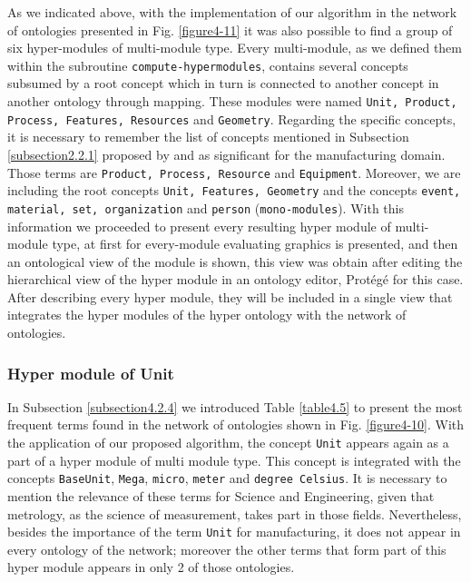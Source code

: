 As we indicated above, with the implementation of our algorithm in the network of ontologies presented in Fig. \ref{figure4-11} it was also possible to find a group of six hyper-modules of multi-module type. Every multi-module, as we defined them within the subroutine \texttt{compute-hypermodules}, contains several concepts subsumed by a root concept which in turn is connected to another concept in another ontology through mapping. These modules were named \texttt{Unit, Product, Process, Features, Resources} and \texttt{Geometry}. Regarding the specific concepts, it is necessary to remember the list of concepts mentioned in Subsection \ref{subsection2.2.1} proposed by \cite{martin_design_2003} and \cite{lastra_ontologies_2009} as significant for the manufacturing domain. Those terms are \texttt{Product, Process, Resource} and \texttt{Equipment}. Moreover, we are including the root concepts \texttt{Unit, Features, Geometry} and the concepts \texttt{event, material, set, organization} and \texttt{person} (\texttt{mono-modules}). With this information we proceeded to present every resulting hyper module of multi-module type, at first for every-module evaluating graphics is presented, and then an ontological view of the module is shown, this view was obtain after editing the hierarchical view of the hyper module in an ontology editor, Protégé for this case. After describing every hyper module, they will be included in a single view that integrates the hyper modules of the hyper ontology with the network of ontologies.

\subsubsection{Hyper module of Unit}\label{subsubsection4.2.5.1}

In Subsection \ref{subsection4.2.4} we introduced Table \ref{table4.5} to present the most frequent terms found in the network of ontologies shown in Fig. \ref{figure4-10}. With the application of our proposed algorithm, the concept \texttt{Unit} appears again as a part of a hyper module of multi module type. This concept is integrated with the concepts \texttt{BaseUnit}, \texttt{Mega}, \texttt{micro}, \texttt{meter} and \texttt{degree Celsius}. It is necessary to mention the relevance of these terms for Science and Engineering,   given that metrology, as the science of measurement, takes part in those fields. Nevertheless, besides the importance of the term   \texttt{Unit} for manufacturing, it  does not appear in every ontology of the network; moreover the other terms that form part of this hyper module appears in only 2 of those ontologies.   

